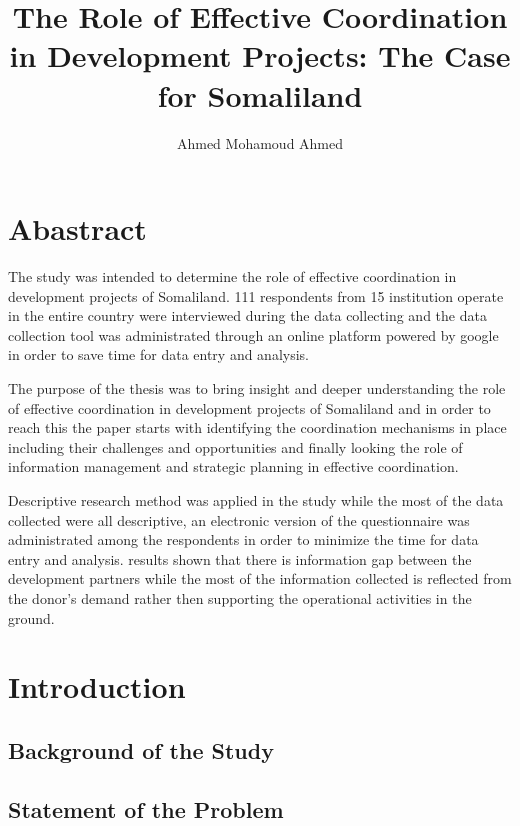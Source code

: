 \documentclass[
]{book}
\title{The Role of Effective Coordination in Development Projects: The Case for Somaliland}
\author{Ahmed Mohamoud Ahmed}
\date{}
\begin{document}
\maketitle

{
\setcounter{tocdepth}{1}
\tableofcontents
}
\hypertarget{abastract}{%
\chapter*{Abastract}\label{abastract}}

The study was intended to determine the role of effective coordination in development projects of Somaliland. 111 respondents from 15 institution operate in the entire country were interviewed during the data collecting and the data collection tool was administrated through an online platform powered by google in order to save time for data entry and analysis.

The purpose of the thesis was to bring insight and deeper understanding the role of effective coordination in development projects of Somaliland and in order to reach this the paper starts with identifying the coordination mechanisms in place including their challenges and opportunities and finally looking the role of information management and strategic planning in effective coordination.

Descriptive research method was applied in the study while the most of the data collected were all descriptive, an electronic version of the questionnaire was administrated among the respondents in order to minimize the time for data entry and analysis. results shown that there is information gap between the development partners while the most of the information collected is reflected from the donor's demand rather then supporting the operational activities in the ground.

\hypertarget{introduction}{%
\chapter{Introduction}\label{introduction}}

\hypertarget{background-of-the-study}{%
\section{Background of the Study}\label{background-of-the-study}}

\hypertarget{statement-of-the-problem}{%
\section{Statement of the Problem}\label{statement-of-the-problem}}
\end{document}
